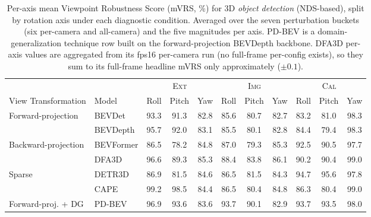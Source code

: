 \begin{table}[t]\centering
\setlength{\tabcolsep}{5pt}
\begin{tabular}{ll ccc ccc ccc}
\toprule
& & \multicolumn{3}{c}{\textsc{Ext}} & \multicolumn{3}{c}{\textsc{Img}} & \multicolumn{3}{c}{\textsc{Cal}}\\
\cmidrule(lr){3-5}\cmidrule(lr){6-8}\cmidrule(lr){9-11}
View Transformation & Model & Roll & Pitch & Yaw & Roll & Pitch & Yaw & Roll & Pitch & Yaw\\
\midrule
\multirow{2}{*}{Forward-projection} & BEVDet   & 93.3 & 91.3 & 82.8 & 85.6 & 80.7 & 82.7 & 83.2 & 81.0 & 98.3\\
 & BEVDepth & 95.7 & 92.0 & 83.1 & 85.5 & 80.1 & 82.8 & 84.4 & 79.4 & 98.3\\
\midrule
\multirow{2}{*}{Backward-projection} & BEVFormer & 86.5 & 78.2 & 84.8 & 87.0 & 79.3 & 85.3 & 92.5 & 90.5 & 97.7\\
 & DFA3D     & 96.6 & 89.3 & 85.3 & 88.4 & 83.8 & 86.1 & 90.2 & 90.4 & 99.0\\
\midrule
\multirow{2}{*}{Sparse} & DETR3D & 86.9 & 81.5 & 84.6 & 86.5 & 81.5 & 84.3 & 94.7 & 95.6 & 97.8\\
 & CAPE   & 99.2 & 98.5 & 84.4 & 86.5 & 80.4 & 84.8 & 86.3 & 80.4 & 99.0\\
\midrule
Forward-proj. + DG & PD-BEV & 96.9 & 93.6 & 83.6 & 93.7 & 90.1 & 82.9 & 93.7 & 93.5 & 98.0\\
\bottomrule
\end{tabular}
\caption{Per-axis mean Viewpoint Robustness Score (mVRS, \%) for 3D \emph{object detection} (NDS-based), split by rotation axis under each diagnostic condition. Averaged over the seven perturbation buckets (six per-camera and all-camera) and the five magnitudes per axis. PD-BEV is a domain-generalization technique row built on the forward-projection BEVDepth backbone. DFA3D per-axis values are aggregated from its fps16 per-camera run (no full-frame per-config exists), so they sum to its full-frame headline mVRS only approximately ($\pm0.1$).}
\label{tab:supp_peraxis_det}
\end{table}
